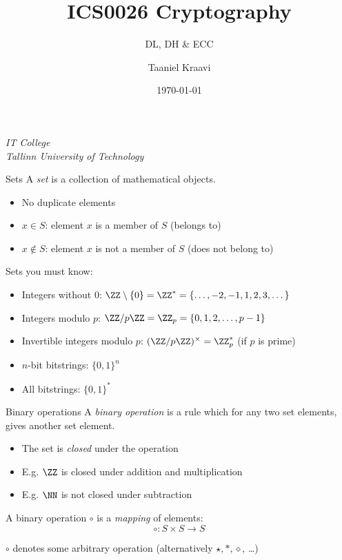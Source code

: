 \usepackage{graphicx}
\graphicspath{ {../../images/} }

\usepackage{pgfplots}
\usetikzlibrary{positioning,calc,external}

\usepackage{soul}

\usetikzlibrary{positioning,calc}
\graphicspath{ {../../images/} }

\title{ICS0026 Cryptography}
\subtitle{DL, DH \& ECC}
\date{\today}
\author{Taaniel Kraavi}
\institute%
{%
    \textit{IT College}\\
    \textit{Tallinn University of Technology}
}


\begin{frame}
  \titlepage
\end{frame}

\begin{frame}{Sets}
  A \emph{set} is a collection of mathematical objects.
  \begin{itemize}[<+(1)->]
    \item No duplicate elements
    \item $x\in S$: element $x$ is a member of $S$ (belongs to)
    \item $x\notin S$: element $x$ is not a member of $S$ (does not belong to)
  \end{itemize}

  \pause
  Sets you must know:
  \begin{itemize}[<+(1)->]
    \item Integers without $0$: $\ZZ\setminus\{0\}=\ZZ^*=\{\dots, -2, -1, 1, 2, 3, \dots\}$
    \item Integers modulo $p$: $\ZZ/p\ZZ = \ZZ_p = \{0, 1, 2, \dots, p-1\}$
    \item Invertible integers modulo $p$: $(\ZZ/p\ZZ)^\times = \ZZ_p^*$ (if $p$ is prime)
    \item $n$-bit bitstrings: $\{0, 1\}^n$
    \item All bitstrings: $\{0, 1\}^*$
  \end{itemize}
\end{frame}

\begin{frame}{Binary operations}
  A \emph{binary operation} is a rule which for any two set elements, gives another set element.
  \begin{itemize}[<+(1)->]
    \item The set is \emph{closed} under the operation
    \item E.g. $\ZZ$ is closed under addition and multiplication
    \item E.g. $\NN$ is not closed under subtraction
  \end{itemize}

  \pause
  A binary operation $\circ$ is a \emph{mapping} of elements:
  \[
    \circ: S \times S \to S
  \]

  \pause
  $\circ$ denotes some arbitrary operation (alternatively $\star, \ast, \diamond$, \dots)
\end{frame}

